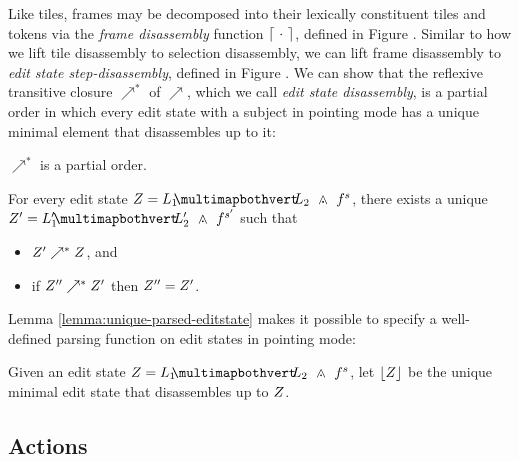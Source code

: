 Like tiles, frames may be decomposed into their
lexically constituent tiles and tokens via the
\emph{frame disassembly} function $\left\lceil~\cdot~\right\rceil$,
defined in Figure .
Similar to how we lift tile disassembly to selection
disassembly, we can lift frame disassembly to
\emph{edit state step-disassembly}, defined in Figure .
We can show that the reflexive transitive closure
$\nearrow^*$ of $\nearrow$, which we call \emph{edit state disassembly},
is a partial order in
which every edit state with a subject in pointing mode
has a unique minimal element that disassembles up to it:
\begin{lemma}
  $\nearrow^*$ is a partial order.
\end{lemma}
\begin{lemma}\label{lemma:unique-parsed-editstate}
  For every edit state $\editState = \zipper{\pointing{\selection_1}{\selection_2}}{\tfrelem^s}$,
  there exists a unique $\editState' = \zipper{\pointing{\selection'_1}{\selection'_2}}{\tfrelem^{s'}}$ such that
  \begin{itemize}
  \item $Z' \nearrow^* Z$, and
  \item if $Z'' \nearrow^* Z'$ then $Z'' = Z'$.
  \end{itemize}
\end{lemma}
Lemma \ref{lemma:unique-parsed-editstate} makes it
possible to specify a well-defined parsing function
on edit states in pointing mode:
\begin{definition}
  Given an edit state $\editState = \zipper{\pointing{\selection_1}{\selection_2}}{\tfrelem^s}$,
  let $\left\lfloor Z\right\rfloor$ be the unique minimal edit state
  that disassembles up to $Z$.
\end{definition}



\subsection{Actions} \label{sec:actions}

